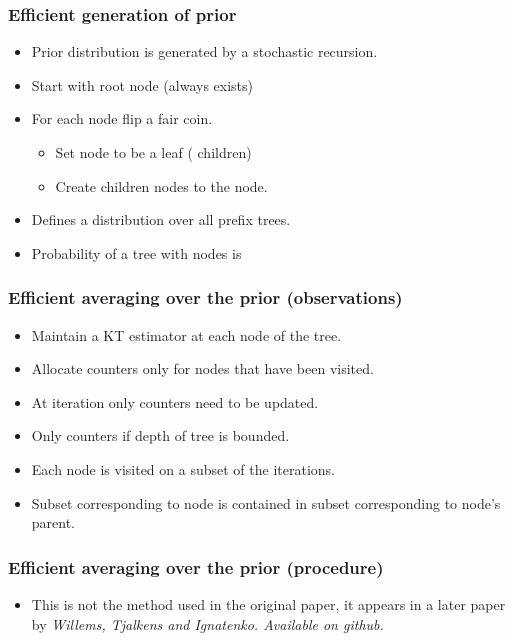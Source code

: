 \documentclass{beamer}
\begin{document}
\begin{frame}
\frametitle{Efficient generation of prior}
\begin{itemize}
\item Prior distribution is generated by a stochastic recursion.
\item Start with root node (always exists)
\item For each node flip a fair coin.
\begin{itemize}
\item {} Set node to be a leaf ( children)
\item {} Create  children nodes to the node.
\end{itemize}
\item Defines a distribution over all prefix trees.
\item Probability of a tree with  nodes is 
\end{itemize}
\end{frame}

\begin{frame}
\frametitle{Efficient averaging over the prior (observations)}
\begin{itemize}
\item Maintain a KT estimator at each node of the tree.
\item Allocate counters only for nodes that have been visited.
\item At iteration  only  counters need to be updated.
\item Only  counters if depth of tree is bounded.
\item Each node is visited on a subset of the iterations.
\item Subset corresponding to node is contained in subset corresponding to node's parent.
\end{itemize}
\end{frame}

\begin{frame}
\frametitle{Efficient averaging over the prior (procedure)}
\begin{itemize}
\item This is not the method used in the original paper, it appears in
  a later paper by \em{Willems, Tjalkens and Ignatenko}. Available on
  github.
\end{itemize}
\end{frame}
\end{document}
